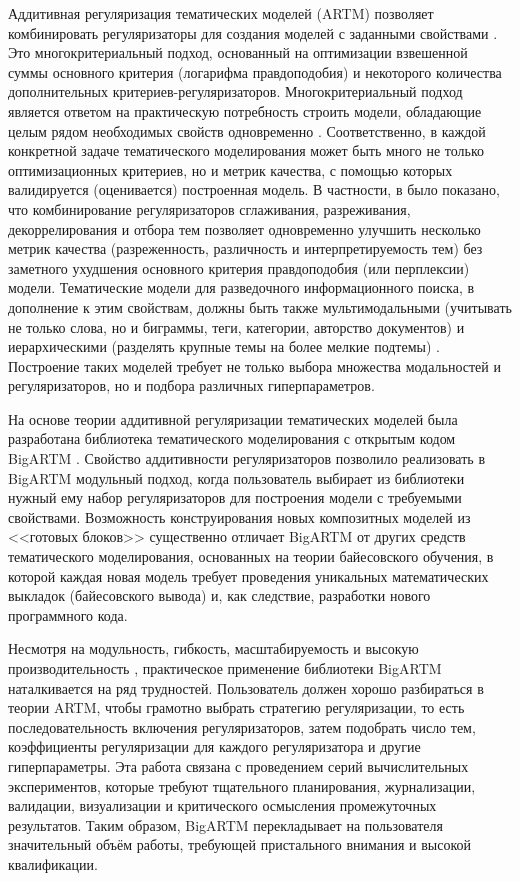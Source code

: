 Аддитивная регуляризация тематических моделей (ARTM) позволяет комбинировать регуляризаторы для создания моделей с заданными свойствами \cite{vorontsov2014additive,voron15mlj}. Это многокритериальный подход, основанный на оптимизации взвешенной суммы основного критерия (логарифма правдоподобия) и некоторого количества дополнительных критериев-регуляризаторов. Многокритериальный подход является ответом на практическую потребность строить модели, обладающие целым рядом необходимых свойств одновременно \cite{kochedykov2017fast}.  
Соответственно, в каждой конкретной задаче тематического моделирования может быть много не только оптимизационных критериев, но и метрик качества, с помощью которых валидируется (оценивается) построенная модель. В частности, в \cite{voron15mlj,voron15mlj} было показано, что комбинирование регуляризаторов сглаживания, разреживания, декоррелирования и отбора тем позволяет одновременно улучшить несколько метрик качества (разреженность, различность и интерпретируемость тем) без заметного ухудшения основного критерия правдоподобия (или перплексии) модели. Тематические модели для разведочного информационного поиска, в дополнение к этим свойствам, должны быть также мультимодальными (учитывать не только слова, но и биграммы, теги, категории, авторство документов) и иерархическими (разделять крупные темы на более мелкие подтемы) \cite{ianina2019regularized}. Построение таких моделей требует не только выбора множества модальностей и регуляризаторов, но и подбора различных гиперпараметров. 

На основе теории аддитивной регуляризации тематических моделей 
была разработана библиотека тематического моделирования с открытым кодом BigARTM \cite{vorontsov2015bigartm,frei2016parallel}.  
Свойство аддитивности регуляризаторов позволило реализовать в BigARTM модульный подход, когда пользователь выбирает из библиотеки нужный ему набор регуляризаторов для построения модели с требуемыми свойствами.  
Возможность конструирования новых композитных моделей из <<готовых блоков>> существенно отличает BigARTM от других средств тематического моделирования, основанных на теории байесовского обучения, в которой каждая новая модель требует проведения уникальных математических выкладок (байесовского вывода) и, как следствие, разработки нового программного кода.  

Несмотря на модульность, гибкость, масштабируемость и высокую производительность \cite{kochedykov2017fast}, практическое применение библиотеки BigARTM наталкивается на ряд трудностей. Пользователь должен хорошо разбираться в теории ARTM, чтобы грамотно выбрать стратегию регуляризации, то есть последовательность включения регуляризаторов, затем подобрать число тем, коэффициенты регуляризации для каждого регуляризатора и другие гиперпараметры. Эта работа связана с проведением серий вычислительных экспериментов, которые требуют тщательного планирования, журнализации, валидации, визуализации и критического осмысления промежуточных результатов. Таким образом, BigARTM перекладывает на пользователя значительный объём работы, требующей пристального внимания и высокой квалификации.  

